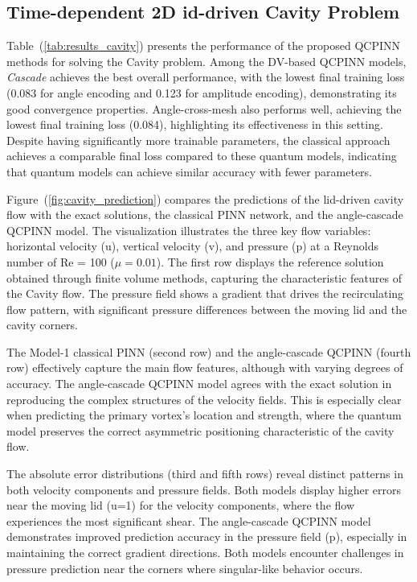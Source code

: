 \subsection{Time-dependent 2D id-driven Cavity Problem}

\label{subsec:results_cavity}

Table~(\ref{tab:results_cavity}) presents the performance of the proposed QCPINN methods for solving the Cavity problem. Among the DV-based QCPINN models, \textit{Cascade} achieves the 
best overall performance, with the lowest final training loss (0.083 for angle encoding and 0.123 for amplitude encoding), demonstrating its good convergence properties.  Angle-cross-mesh also performs well, achieving the lowest final training loss (0.084), highlighting its effectiveness in this setting. 
%
Despite having significantly more trainable parameters, the classical approach achieves a comparable final loss compared to these quantum models, indicating that quantum models can achieve similar accuracy with fewer parameters.

Figure~(\ref{fig:cavity_prediction}) compares the predictions of the lid-driven cavity flow with the exact solutions, the classical PINN network, and the angle-cascade QCPINN model. The visualization illustrates the three key flow variables: horizontal velocity (u), vertical velocity (v), and pressure (p) at a Reynolds number of Re = 100 ($\mu = 0.01$).
%
The first row displays the reference solution obtained through finite volume methods, capturing the characteristic features of the Cavity flow. The pressure field shows a gradient that drives the recirculating flow pattern, with significant pressure differences between the moving lid and the cavity corners.

The Model-1 classical PINN (second row) and the angle-cascade QCPINN (fourth row) effectively capture the main flow features, although with varying degrees of accuracy. The angle-cascade QCPINN model agrees with the exact solution in reproducing the complex structures of the velocity fields. This is especially clear when predicting the primary vortex's location and strength, where the quantum model preserves the correct asymmetric positioning characteristic of the cavity flow.

The absolute error distributions (third and fifth rows) reveal distinct patterns in both velocity components and pressure fields. Both models display higher errors near the moving lid (u=1) for the velocity components, where the flow experiences the most significant shear. The angle-cascade QCPINN model demonstrates improved prediction accuracy in the pressure field (p), especially in maintaining the correct gradient directions. Both models encounter challenges in pressure prediction near the corners where singular-like behavior occurs.


